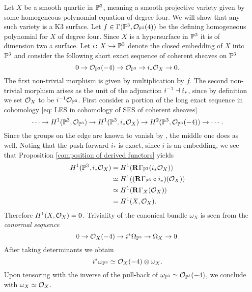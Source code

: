 \begin{example}
    Let $X$ be a smooth quartic in $\mathbb P^3$, meaning a smooth projective variety given by some homogeneous polynomial equation of degree four.
    We will show that any such variety is a K3 surface. Let $f \in \Gamma(\mathbb P^3, {\mathcal{O}_{\mathbb P^3}}(4))$ be the defining homogeneous polynomial for $X$ of degree four.
    Since $X$ is a hypersurface in $\mathbb P^3$ it is of dimension two \ie a surface. Let $i \colon X \hookrightarrow \mathbb P^3$ denote the closed embedding of $X$ into $\mathbb P^3$ and consider the following short exact sequence of coherent sheaves on $\mathbb P^3$
    \[
        0 \to {\mathcal{O}_{\mathbb P^3}}(-4) \to {\mathcal{O}_{\mathbb P^3}} \to i_*{\mathcal{O}_{X}} \to 0.
    \]
    The first non-trivial morphism is given by multiplication by $f$.
    The second non-trivial morphism arises as the unit of the adjunction $i^{-1} \dashv i_*$, since by definition we set ${\mathcal{O}_{X}}$ to be $i^{-1}{\mathcal{O}_{\mathbb P^3}}$.
    First consider a portion of the long exact sequence in cohomology \eqref{eq: LES in cohomology of SES of coherent sheaves}
    \[
        \cdots \to H^{1}(\mathbb P^3, {\mathcal{O}_{\mathbb P^3}}) \to H^{1}(\mathbb P^3, i_*{\mathcal{O}_{X}}) \to H^{2}(\mathbb P^3, {\mathcal{O}_{\mathbb P^3}}(-4)) \to \cdots.
    \]
    Since the groups on the edge are known to vanish by \cite[\S III, Theorem 5.1]{Hartshorne1977}, the middle one does as well. Noting that the push-forward $i_*$ is exact, since $i$ is an embedding, we see that Proposition \ref{composition of derived functors} yields
    \begin{align*}
        H^{1}(\mathbb P^3, i_*{\mathcal{O}_{X}}) &=
        H^1(\mathbf{R}^{}\Gamma_{\mathbb P^3}(i_*{\mathcal{O}_{X}})) \\
        &\simeq H^1((\mathbf{R}^{}\Gamma_{\mathbb P^3} \circ i_*)({\mathcal{O}_{X}})) \\
        &\simeq H^1(\mathbf{R}^{}\Gamma_X({\mathcal{O}_{X}})) \\
        & = H^{1}(X, {\mathcal{O}_{X}}).
    \end{align*}
    Therefore $H^{1}(X, {\mathcal{O}_{X}}) = 0$. Triviality of the canonical bundle $\omega_X$ is seen from the \emph{conormal sequence}
    \[
        0 \to {\mathcal{O}_{X}}(-4) \to i^*\Omega_{\mathbb P^3} \to \Omega_X \to 0.
    \]
    After taking determinants we obtain
    \[
        i^*\omega_{\mathbb P^3} \simeq {\mathcal{O}_{X}}(-4) \otimes \omega_X.
    \]
    Upon tensoring with the inverse of the pull-back of $\omega_{\mathbb P^3} \simeq {\mathcal{O}_{\mathbb P^3}}(-4)$, we conclude with $\omega_X \simeq {\mathcal{O}_{X}}$.
\end{example}

